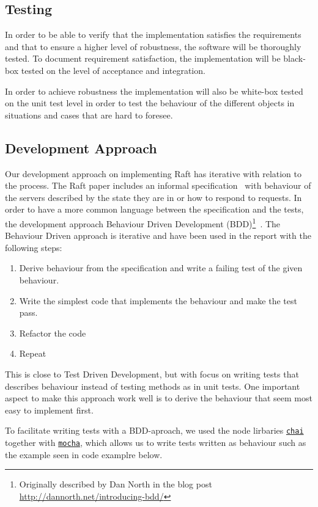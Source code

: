 
\subsection{Testing} %
\label{sub:testing}

In order to be able to verify that the implementation satisfies the requirements and that to ensure a higher level of robustness, the software will be thoroughly tested. To document requirement satisfaction, the implementation will be black-box tested on the level of acceptance and integration.

In order to achieve robustness the implementation will also be white-box tested on the unit test level in order to test the behaviour of the different objects in situations and cases that are hard to foresee.


\subsection{Development Approach}
\label{sub:development_approach}

Our development approach on implementing Raft has iterative with relation to the process. The Raft paper includes an informal specification~\cite[page~4]{Raft} with behaviour of the servers described by the state they are in or how to respond to requests. In order to have a more common language between the specification and the tests, the development approach Behaviour Driven Development (BDD)\footnote{Originally described by Dan North in the blog post \url{http://dannorth.net/introducing-bdd/}}~\cite{bddpaper}. The Behaviour Driven approach is iterative and have been used in the report with the following steps:

\begin{enumerate}
    \item Derive behaviour from the specification and write a failing test of the given behaviour.
    \item Write the simplest code that implements the behaviour and make the test pass.
    \item Refactor the code
    \item Repeat
\end{enumerate}

This is close to Test Driven Development, but with focus on writing tests that describes behaviour instead of testing methods as in unit tests.
One important aspect to make this approach work well is to derive the behaviour that seem most easy to implement first.

To facilitate writing tests with a BDD-aproach, we used the node lirbaries \href{http://chaijs.com/}{\tt chai} together with \href{http://mochajs.org}{\tt mocha}, which allows us to write tests written as behaviour such as the example seen in code examplre below.





